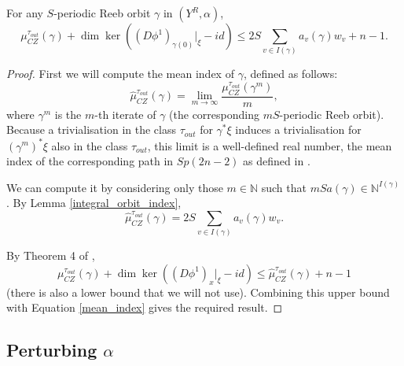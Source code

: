 \documentclass{article}
\numberwithin{equation}{section}
\numberwithin{figure}{section}
\begin{document}
\begin{lem}
\label{index_estimate}
    For any $S$-periodic Reeb orbit $\gamma$ in $(Y^R,\alpha)$, 
    \begin{equation}
    \mu_{CZ}^{\tau_{out}}(\gamma)+\dim\ker ((D\phi^1)_{\gamma(0)}|_\xi-id)\leq 2S\sum_{v\in I(\gamma)}a_v(\gamma)w_v+n-1.
    \end{equation}
\end{lem}

\begin{proof}
    First we will compute the mean index of $\gamma$, defined as follows:
    \begin{equation}
        \hat{\mu}_{CZ}^{\tau_{out}}(\gamma)=\lim_{m\to \infty}\frac{\mu_{CZ}^{\tau_{out}}(\gamma^m)}{m},
    \end{equation}
    where $\gamma^m$ is the $m$-th iterate of $\gamma$ (the corresponding $mS$-periodic Reeb orbit). Because a trivialisation in the class $\tau_{out}$ for $\gamma^*\xi$ induces a trivialisation for $(\gamma^m)^*\xi$ also in the class $\tau_{out}$, this limit is a well-defined real number, the mean index of the corresponding path in $Sp(2n-2)$ as defined in \cite{Long_iteration}.
    
    We can compute it by considering only those $m\in\mathbb{N}$ such that $mSa(\gamma)\in\mathbb{N}^{I(\gamma)}$. By Lemma \ref{integral_orbit_index}, 
    \begin{equation}
    \label{mean_index}
        \hat{\mu}_{CZ}^{\tau_{out}}(\gamma)=2S\sum_{v\in I(\gamma)}a_v(\gamma)w_v.
    \end{equation}

    By Theorem 4 of \cite{Long_iteration},
    \begin{equation}
    \mu_{CZ}^{\tau_{out}}(\gamma)+\dim\ker ((D\phi^1)_x|_\xi-id)\leq \hat{\mu}_{CZ}^{\tau_{out}}(\gamma)+n-1
    \end{equation}
    (there is also a lower bound that we will not use). Combining this upper bound with Equation \eqref{mean_index} gives the required result.
\end{proof}


\subsection{Perturbing $\alpha$}
\end{document}
